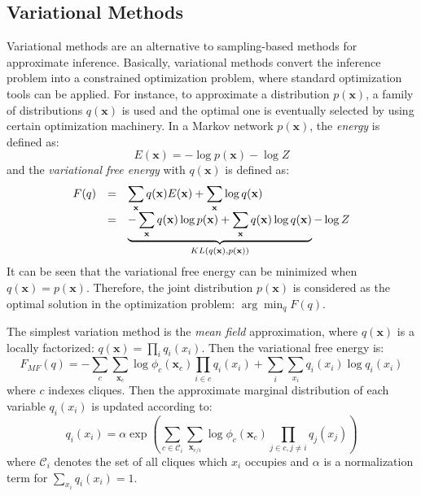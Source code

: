 \subsection{Variational Methods}
Variational methods are an alternative to sampling-based methods for approximate inference. Basically, variational methods convert the inference problem into a constrained optimization 
problem, where standard optimization tools can be applied. For instance, to approximate a distribution $p(\mathbf{x})$, a family of distributions $q(\mathbf{x})$ is used and the optimal 
one is eventually selected by using certain optimization machinery. In a Markov network $p(\mathbf{x})$, the \emph{energy} is defined as: 
\begin{equation}
	E(\mathbf{x})=-\log p(\mathbf{x})-\log Z
\end{equation}
and the \emph{variational free energy} with $q(\mathbf{x})$ is defined as: 
\begin{equation}
	\begin{array}{rcl}	
	F(q)&=&\displaystyle\sum_{\mathbf{x}}q(\mathbf{x}) E(\mathbf{x})+\sum_{\mathbf{x}}\log q(\mathbf{x})\\ 
	\displaystyle		   &=&\underbrace{-\sum_{\mathbf{x}}q(\mathbf{x})\log p(\mathbf{x})+\sum_{\mathbf{x}} q(\mathbf{x})\log q(\mathbf{x})}_{KL(q(\mathbf{x}),p(\mathbf{x}))}-\log Z
    \end{array}
\end{equation}
It can be seen that the variational free energy can be minimized when $q(\mathbf{x})=p(\mathbf{x})$. Therefore, the joint distribution $p(\mathbf{x})$ is considered as 
the optimal solution in the optimization problem: $\arg\min_{q} F(q)$.  

The simplest variation method is the \emph{mean field} approximation, where $q(\mathbf{x})$ is a locally factorized: $q(\mathbf{x})=\prod_{i}q_i(x_i)$. Then the variational free energy is: 
\begin{equation}
	F_{MF}(q)=-\sum_{c}\sum_{\mathbf{x}_c}\log \phi_c(\mathbf{x}_c) \prod_{i\in c}q_i (x_i)+ \sum_i\sum_{x_i} q_i(x_i)\log q_i(x_i)
\end{equation}
where $c$ indexes cliques. Then the approximate marginal distribution of each variable $q_i(x_i)$ is updated according to:    
\begin{equation}
	q_i(x_i)=\alpha \exp \left(\sum_{c\in\mathcal{C}_i} \sum_{\mathbf{x}_{c/i}} \log \phi_c(\mathbf{x}_c)\prod_{j\in c, j\neq i}q_j(x_j)\right)
\end{equation}
where $\mathcal{C}_i$ denotes the set of all cliques which $x_i$ occupies and $\alpha$ is a normalization term for $\sum_{x_i}q_i (x_i)=1$.   

